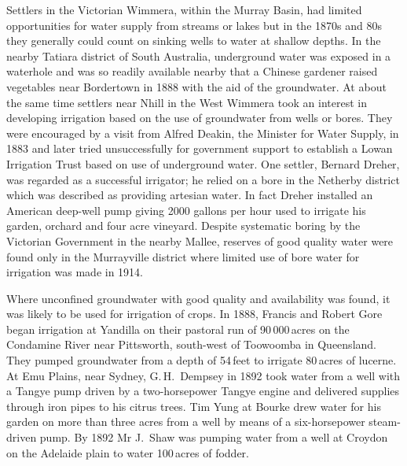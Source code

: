Settlers in the Victorian Wimmera,  within the
Murray Basin, had limited opportunities for water supply from streams
or lakes but in the 1870s and 80s they generally could count on
sinking wells to water at shallow depths.  In the nearby
Tatiara district of South Australia,
underground water was exposed in a waterhole and was so readily
available nearby that a Chinese
gardener raised vegetables near Bordertown
 in 1888 with the aid of the groundwater. At
about the same time settlers near Nhill   in the
West Wimmera took an interest in developing irrigation based on the
use of groundwater from wells or bores.  They
were encouraged by a visit from Alfred Deakin,  the
Minister for Water Supply, in 1883 and later tried unsuccessfully for
government support to establish a Lowan Irrigation Trust
 based on use of underground water.  One
settler, Bernard Dreher,   was regarded as a
successful irrigator; he relied on a bore in the Netherby district
 which was described as providing artesian
water.  In fact Dreher installed an American
deep-well pump giving 2000 gallons
per hour used to irrigate his garden,
orchard and four acre vineyard.  Despite
systematic boring by the Victorian Government in the nearby Mallee,
 reserves of good quality water were found only
in the Murrayville district where limited
use of bore water for irrigation was made in
1914.

Where unconfined groundwater with good quality and availability was
found, it was likely to be used for irrigation of crops.  In 1888,
Francis and Robert Gore  began irrigation at Yandilla
on their pastoral run of 90\,000\,acres on the Condamine River
 near Pittsworth,
south-west of Toowoomba in Queensland.  They pumped groundwater from a
depth of 54\,feet to irrigate 80\,acres of lucerne. At Emu Plains,
 near Sydney, G.\,H.~Dempsey  in 1892 took water from a well with a Tangye pump
 driven by a two-horsepower Tangye
engine and delivered supplies thr\-ough iron
pipes to his citrus trees.  Tim Yung
at Bourke  drew water for his
garden on more than three acres from a well by means
of a six-horsepower steam-driven
pump. By 1892 Mr J.~Shaw was pumping water from a well at Croydon
 on the Adelaide plain to water 100\,acres of
fodder.

